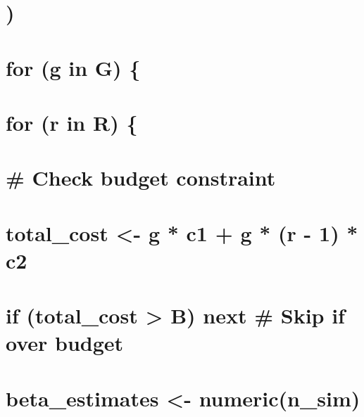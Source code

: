 \documentclass[
]{article}
\begin{document}
\hypertarget{section-11}{%
\section{)}\label{section-11}}

\hypertarget{section-12}{%
\section{}\label{section-12}}

\hypertarget{for-g-in-g}{%
\section{for (g in G) \{}\label{for-g-in-g}}

\hypertarget{for-r-in-r}{%
\section{for (r in R) \{}\label{for-r-in-r}}

\hypertarget{check-budget-constraint}{%
\section{\# Check budget constraint}\label{check-budget-constraint}}

\hypertarget{total_cost---g-c1-g-r---1-c2}{%
\section{total\_cost \textless- g * c1 + g * (r - 1) *
c2}\label{total_cost---g-c1-g-r---1-c2}}

\hypertarget{if-total_cost-b-next-skip-if-over-budget}{%
\section{if (total\_cost \textgreater{} B) next \# Skip if over
budget}\label{if-total_cost-b-next-skip-if-over-budget}}

\hypertarget{section-13}{%
\section{}\label{section-13}}

\hypertarget{beta_estimates---numericn_sim}{%
\section{beta\_estimates \textless-
numeric(n\_sim)}\label{beta_estimates---numericn_sim}}
\end{document}
